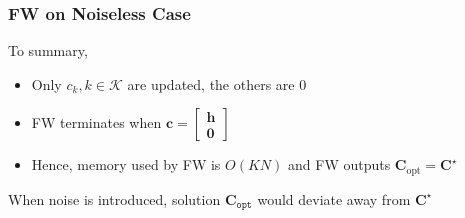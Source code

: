 \documentclass[10pt,xcolor={usenames,dvipsnames,table}]{beamer}
\begin{document}
\begin{frame}
    \frametitle{FW on Noiseless Case}
    To summary,
    \begin{itemize}
        \item Only $c_{k}, k\in \mathcal{K}$ are updated, the others are $0$
        \item FW terminates when $\bm{c} = \begin{bmatrix}
        \bm{h} \\ \bm{0}
        \end{bmatrix}$
    \item Hence, memory used by FW is $O(KN)$ and FW outputs $\bm{C}_{\text{opt}} = \bm{C}^{\star}$
    \end{itemize}

    \begin{alertblock}
        
    When noise is introduced, solution $\bm{C}_{\texttt{opt}}$ would deviate away from $\bm{C}^{\star}$
    \end{alertblock}


\end{frame}
\end{document}
